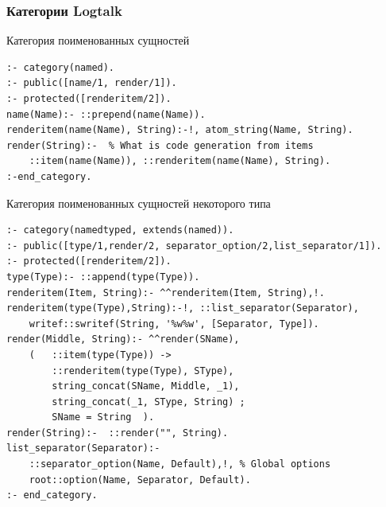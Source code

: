\documentclass[10pt]{beamer}
\begin{document}
\begin{frame}[fragile] \frametitle{Категории Logtalk} Категория поименованных сущностей
\begin{verbatim}
:- category(named).
:- public([name/1, render/1]).
:- protected([renderitem/2]).
name(Name):- ::prepend(name(Name)).
renderitem(name(Name), String):-!, atom_string(Name, String).
render(String):-  % What is code generation from items
    ::item(name(Name)), ::renderitem(name(Name), String).
:-end_category.
\end{verbatim}

Категория поименованных сущностей некоторого типа
\begin{verbatim}
:- category(namedtyped, extends(named)).
:- public([type/1,render/2, separator_option/2,list_separator/1]).
:- protected([renderitem/2]).
type(Type):- ::append(type(Type)).
renderitem(Item, String):- ^^renderitem(Item, String),!.
renderitem(type(Type),String):-!, ::list_separator(Separator),
    writef::swritef(String, '%w%w', [Separator, Type]).
render(Middle, String):- ^^render(SName),
    (   ::item(type(Type)) ->
        ::renderitem(type(Type), SType),
        string_concat(SName, Middle, _1),
        string_concat(_1, SType, String) ;
        SName = String  ).
render(String):-  ::render("", String).
list_separator(Separator):-
    ::separator_option(Name, Default),!, % Global options
    root::option(Name, Separator, Default).
:- end_category.

\end{verbatim}
\end{frame}
\end{document}
